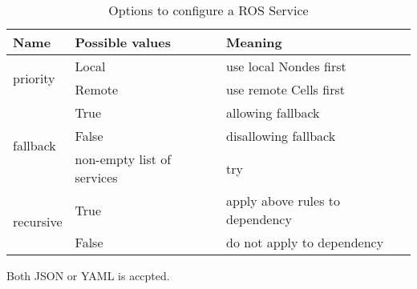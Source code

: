 \begin{table}
  \renewcommand{\arraystretch}{1.3}
  \caption{Options to configure a ROS Service}
  \label{table:srv-opt}
  \centering
  \begin{tabular}{|l|l|l|}
    \hline
    \bfseries Name & \bfseries Possible values & \bfseries Meaning \\
    \hline
    \multirow{2}{*}{priority}  & Local  & use local Nondes first \\
    \cline{2-3}
                               & Remote & use remote Cells first \\
    \hline
    \multirow{3}{*}{fallback}  & True   & allowing fallback \\
    \cline{2-3}
                               & False  & disallowing fallback \\
    \cline{2-3}
                               & non-empty list of services & try  \\
    \hline
    \multirow{2}{*}{recursive} & True   & apply above rules to dependency \\
    \cline{2-3}
                               & False  & do not apply to dependency \\
    \hline
  \end{tabular}
\end{table} 

Both JSON or YAML is accpted.
